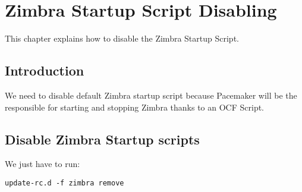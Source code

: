 

\chapter{Zimbra Startup Script Disabling}
\label{chap:zimbra-startup-script-disabling}
This chapter explains how to disable the Zimbra Startup Script.

\section {Introduction}
We need to disable default Zimbra startup script because Pacemaker will be the responsible for starting and stopping Zimbra thanks to an OCF Script.

\section {Disable Zimbra Startup scripts}
We just have to run:
\begin{verbatim}
update-rc.d -f zimbra remove
\end{verbatim}
